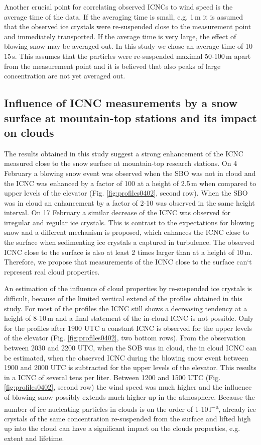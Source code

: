 \documentclass[draft,linenumbers]{agujournal}
\begin{document}
Another crucial point for correlating observed ICNCs to wind speed is the average time of the data. If the averaging time is small, e.g. 1\,\si{m} it is assumed that the observed ice crystals were re-suspended close to the measurement point and immediately transported. If the average time is very large, the effect of blowing snow may be averaged out. In this study we chose an average time of 10-15\,\si{s}. This assumes that the particles were re-suspended maximal 50-100\,\si{m} apart from the measurement point and it is believed that also peaks of large concentration are not yet averaged out. 


\subsection{Influence of ICNC measurements by a snow surface at mountain-top stations and its impact on clouds}

The results obtained in this study suggest a strong enhancement of the ICNC measured close to the snow surface at mountain-top research stations. On 4 February a blowing snow event was observed when the SBO was not in cloud and the ICNC was enhanced by a factor of 100 at a height of 2.5\,\si{m} when compared to upper levels of the elevator (Fig. \ref{fig:profiles0402}, second row). When the SBO was in cloud an enhancement by a factor of 2-10 was observed in the same height interval. On 17 February a similar decrease of the ICNC was observed for irregular and regular ice crystals. This is contrast to the expectations for blowing snow and a different mechanism is proposed, which enhances the ICNC close to the surface when sedimenting ice crystals a captured in turbulence. The observed ICNC close to the surface is also at least 2 times larger than at a height of 10\,\si{m}. Therefore, we propose that measurements of the ICNC close to the surface can`t represent real cloud properties. 

An estimation of the influence of cloud properties by re-suspended ice crystals is difficult, because of the limited vertical extend of the profiles obtained in this study. For most of the profiles the ICNC still shows a decreasing tendency at a height of 8-10\,\si{m} and a final statement of the in-cloud ICNC is not possible. Only for the profiles after 1900 UTC a constant ICNC is observed for the upper levels of the elevator (Fig. \ref{fig:profiles0402}, two bottom rows). From the observation between  2030 and 2200 UTC, when the SOB was in cloud, the in cloud ICNC can be estimated, when the observed ICNC during the blowing snow event between 1900 and 2000 UTC is subtracted for the upper levels of the elevator. This results in a ICNC of several tens per liter. Between 1200 and 1500 UTC (Fig. \ref{fig:profiles0402}, second row) the wind speed was much higher and the influence of blowing snow possibly extends much higher up in the atmosphere. Because the number of ice nucleating particles in clouds is on the order of 1-10\,\si{l^{-a}}, already ice crystals of the same concentration re-suspended from the surface and lifted high up into the cloud can have a significant impact on the clouds properties, e.g. extent and lifetime. 
\end{document}
